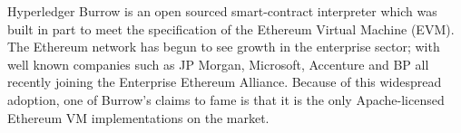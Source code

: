 Hyperledger Burrow is an open sourced smart-contract interpreter which was built 
in part to meet the specification of the Ethereum Virtual Machine (EVM). The 
Ethereum network has begun to see growth in the enterprise sector; with well known 
companies such as JP Morgan, Microsoft, Accenture and BP all recently joining the 
Enterprise Ethereum Alliance. Because of this widespread adoption, one of Burrow’s 
claims to fame is that it is the only Apache-licensed Ethereum VM implementations 
on the market.\cite{Hyperledger Burrow}

